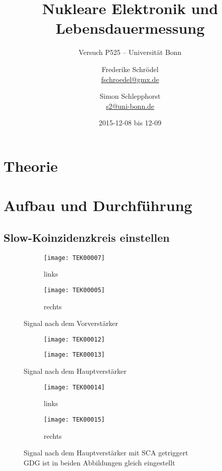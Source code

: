 \documentclass[11pt, ngerman, fleqn, DIV=15, headinclude, BCOR=2cm]{scrreprt}
\title{Nukleare Elektronik und Lebensdauermessung}
\subtitle{Versuch P525 -- Universität Bonn}
\author{
	Frederike Schrödel \\
	\small{\href{mailto:fschroedel@gmx.de}{fschroedel@gmx.de}}
	\and
	Simon Schlepphorst \\
	\small{\href{mailto:s2@uni-bonn.de}{s2@uni-bonn.de}}
}
\date{2015-12-08 bis 12-09}
\begin{document}
\maketitle

\begin{abstract}
\end{abstract}


\tableofcontents

\chapter{Theorie}


\chapter{Aufbau und Durchführung}

\section{Slow-Koinzidenzkreis einstellen}

\begin{figure}
	\centering
	\begin{subfigure}{0.49 \textwidth}
		\texttt{[image: TEK00007]}
		\caption{%
			links
		}
		\label{fig:slow_signal-li}
	\end{subfigure}
	\begin{subfigure}{0.49 \textwidth}
		\texttt{[image: TEK00005]}
		\caption{%
			rechts
		}
		\label{fig:slow_signal-re}
	\end{subfigure}
	\caption{%
		Signal nach dem Vorverstärker
	}
	\label{fig:slow_signal}
\end{figure}

\begin{figure}
	\centering
	\begin{subfigure}{0.49 \textwidth}
		\texttt{[image: TEK00012]}
	\end{subfigure}
	\begin{subfigure}{0.49 \textwidth}
		\texttt{[image: TEK00013]}
	\end{subfigure}
	\caption{%
		Signal nach dem Hauptverstärker
	}
	\label{fig:slow_signal_hv}
\end{figure}

\begin{figure}
	\centering
	\begin{subfigure}{0.49 \textwidth}
		\texttt{[image: TEK00014]}
		\caption{%
			links
		}
		\label{fig:slow_signal_sca_trig-li}
	\end{subfigure}
	\begin{subfigure}{0.49 \textwidth}
		\texttt{[image: TEK00015]}
		\caption{%
			rechts
		}
		\label{fig:slow_signal_sca_trig-re}
	\end{subfigure}
	\caption{%
		Signal nach dem Hauptverstärker mit SCA getriggert\\
		GDG ist in beiden Abbildungen gleich eingestellt
	}
	\label{fig:slow_signal_sca_trig}
\end{figure}
\end{document}
